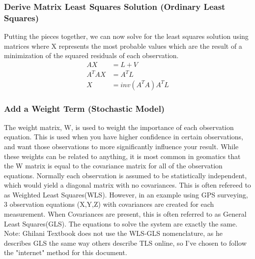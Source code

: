 \subsubsection*{Derive Matrix Least Squares Solution (Ordinary Least Squares)}
Putting the pieces together, we can now solve for the least squares solution using matrices where X represents the most probable values which are the result of a minimization of the squared residuals of each observation.
\begin{align*}
AX &= L + V \\
A^TAX &= A^TL \\
X &= inv(A^TA)A^TL
\end{align*}
\subsubsection*{Add a Weight Term (Stochastic Model)}
The weight matrix, W, is used to weight the importance of each observation equation.  This is used when you have higher confidence in certain observations, and want those observations to more significantly influence your result.  While these weights can be related to anything, it is most common in geomatics that the W matrix is equal to the covariance matrix for all of the observation equations.  Normally each observation is assumed to be statistically independent, which would yield a diagonal matrix with no covariances.  This is often refereed to as Weighted Least Squares(WLS).  However, in an example using GPS surveying, 3 observation equations (X,Y,Z) with covariances are created for each measurement.  When Covariances are present, this is often referred to as General Least Squares(GLS).  The equations to solve the system are exactly the same.  Note: Ghilani Textbook does not use the WLS-GLS nomenclature, as he describes GLS the same way others describe TLS online, so I've chosen to follow the "internet" method for this document.

